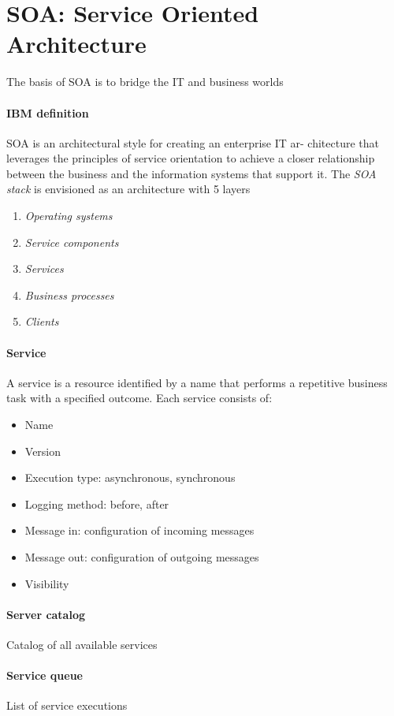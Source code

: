 \section{SOA: Service Oriented Architecture}
The basis of SOA is to bridge the IT and business worlds

\paragraph{IBM definition}
SOA is an architectural style for creating an enterprise IT ar-
chitecture that leverages the principles of service orientation to achieve a closer
relationship between the business and the information systems that support it.
The \textit{SOA stack} is envisioned as an architecture with 5 layers
\begin{enumerate}
    \item \textit{Operating systems}
    \item \textit{Service components}
    \item \textit{Services}
    \item \textit{Business processes}
    \item \textit{Clients}
\end{enumerate}

\paragraph{Service} 
A service is a resource identified by a name that performs a repetitive business task with a specified outcome. Each service consists of:
\begin{itemize}
    \item Name
    \item Version
    \item Execution type: asynchronous, synchronous
    \item Logging method: before, after
    \item Message in: configuration of incoming messages
    \item Message out: configuration of outgoing messages
    \item Visibility
\end{itemize}

\paragraph{Server catalog} 
Catalog of all available services

\paragraph{Service queue} 
List of service executions

\newpage